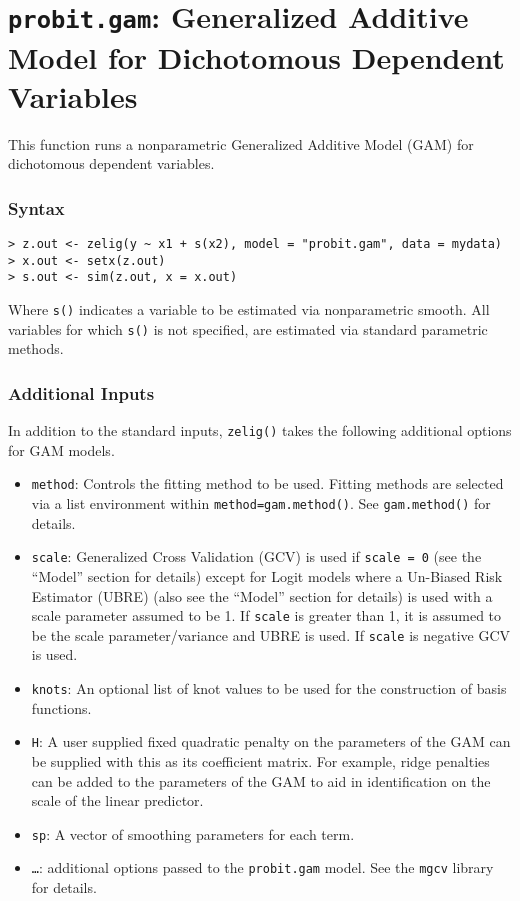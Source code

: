 
\section{{\tt probit.gam}: Generalized Additive Model for Dichotomous Dependent Variables}

This function runs a nonparametric Generalized Additive Model (GAM) for dichotomous dependent variables. 

\subsubsection{Syntax}
\begin{verbatim}
> z.out <- zelig(y ~ x1 + s(x2), model = "probit.gam", data = mydata) 
> x.out <- setx(z.out)
> s.out <- sim(z.out, x = x.out)
\end{verbatim}
Where {\tt s()} indicates a variable to be estimated via nonparametric smooth. All variables for which  {\tt s()} is not specified, are estimated via standard parametric methods. 

\subsubsection{Additional Inputs}
In addition to the standard inputs, {\tt zelig()} takes the following additional options for GAM models.
\begin{itemize}
\item {\tt method}: Controls the fitting method to be used. Fitting methods are selected via a list environment within {\tt method=gam.method()}. See {\tt gam.method()} for details. 
\item {\tt scale}:  Generalized Cross Validation (GCV) is used if {\tt scale = 0} (see the ``Model'' section for details) except for Logit models where a Un-Biased Risk Estimator (UBRE) (also see the ``Model'' section for details) is used with a scale parameter assumed to be 1. If {\tt scale} is greater than 1, it is assumed to be the scale parameter/variance and UBRE is used. If {\tt scale} is negative GCV is used.
\item {\tt knots}: An optional list of knot values to be used for the construction of basis functions. 
\item {\tt H}: A user supplied fixed quadratic penalty on the parameters of the GAM can be supplied with this as its coefficient matrix. For example, ridge penalties can be added to the parameters of the GAM to aid in identification on the scale of the linear predictor.
\item {\tt sp}: A vector of smoothing parameters for each term.
\item {\tt \ldots}: additional options passed to the {\tt probit.gam} model. See the {\tt mgcv} library for details. 
\end{itemize}


